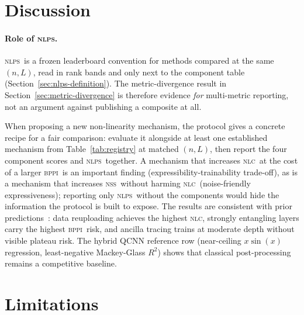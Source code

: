 \documentclass{article}
\newcommand{\nlc}{\textsc{nlc}}
\newcommand{\bppi}{\textsc{bppi}}
\newcommand{\nss}{\textsc{nss}}
\newcommand{\nlps}{\textsc{nlps}}
\begin{document}
\section{Discussion}
\label{sec:discussion}

\paragraph{Role of \nlps.}
\nlps\ is a frozen leaderboard convention for methods compared at the same $(n,L)$, read in rank bands and only next to the component table (Section~\ref{sec:nlps-definition}).
The metric-divergence result in Section~\ref{sec:metric-divergence} is therefore evidence \emph{for} multi-metric reporting, not an argument against publishing a composite at all.

When proposing a new non-linearity mechanism, the protocol gives a concrete recipe for a fair comparison: evaluate it alongside at least one established mechanism from Table~\ref{tab:registry} at matched $(n, L)$, then report the four component scores and \nlps\ together.
A mechanism that increases \nlc\ at the cost of a larger \bppi\ is an important finding (expressibility-trainability trade-off), as is a mechanism that increases \nss\ without harming \nlc\ (noise-friendly expressiveness); reporting only \nlps\ without the components would hide the information the protocol is built to expose.
The results are consistent with prior predictions~\citep{perez2020data,schuld2021effect,mcclean2018barren,holmes2022connecting}: data reuploading achieves the highest \nlc, strongly entangling layers carry the highest \bppi\ risk, and ancilla tracing trains at moderate depth without visible plateau risk.
The hybrid QCNN reference row (near-ceiling $x\sin(x)$ regression, least-negative Mackey-Glass $R^2$) shows that classical post-processing remains a competitive baseline.

\section{Limitations}
\label{sec:limitations}
\end{document}
